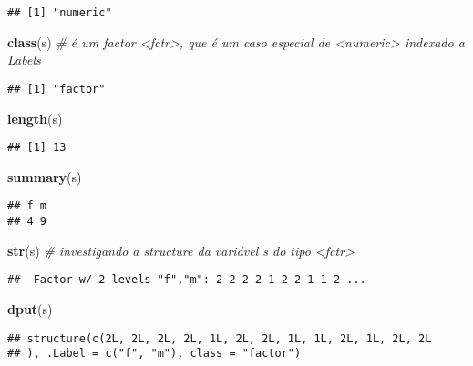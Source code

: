 \documentclass[]{article}
\newenvironment{Shaded}{\begin{snugshade}}{\end{snugshade}}
\newcommand{\KeywordTok}[1]{\textcolor[rgb]{0.13,0.29,0.53}{\textbf{#1}}}
\newcommand{\CommentTok}[1]{\textcolor[rgb]{0.56,0.35,0.01}{\textit{#1}}}
\newcommand{\NormalTok}[1]{#1}
\begin{document}
\begin{verbatim}
## [1] "numeric"
\end{verbatim}

\begin{Shaded}
\begin{Highlighting}[]
\KeywordTok{class}\NormalTok{(s) }\CommentTok{# é um factor <fctr>, que é um caso especial de <numeric> indexado a Labels}
\end{Highlighting}
\end{Shaded}

\begin{verbatim}
## [1] "factor"
\end{verbatim}

\begin{Shaded}
\begin{Highlighting}[]
\KeywordTok{length}\NormalTok{(s)}
\end{Highlighting}
\end{Shaded}

\begin{verbatim}
## [1] 13
\end{verbatim}

\begin{Shaded}
\begin{Highlighting}[]
\KeywordTok{summary}\NormalTok{(s)}
\end{Highlighting}
\end{Shaded}

\begin{verbatim}
## f m 
## 4 9
\end{verbatim}

\begin{Shaded}
\begin{Highlighting}[]
\KeywordTok{str}\NormalTok{(s) }\CommentTok{# investigando a structure da variável s do tipo <fctr>}
\end{Highlighting}
\end{Shaded}

\begin{verbatim}
##  Factor w/ 2 levels "f","m": 2 2 2 2 1 2 2 1 1 2 ...
\end{verbatim}

\begin{Shaded}
\begin{Highlighting}[]
\KeywordTok{dput}\NormalTok{(s)}
\end{Highlighting}
\end{Shaded}

\begin{verbatim}
## structure(c(2L, 2L, 2L, 2L, 1L, 2L, 2L, 1L, 1L, 2L, 1L, 2L, 2L
## ), .Label = c("f", "m"), class = "factor")
\end{verbatim}
\end{document}
